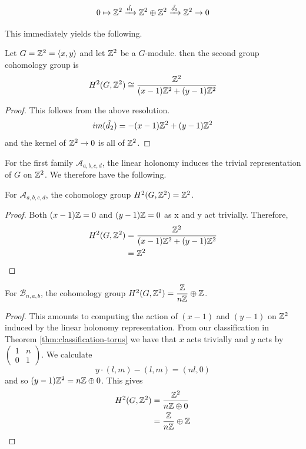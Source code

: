 $$
    0 \mapsto \mathbb{Z}^2 \xrightarrow{\tilde{d_1}} \mathbb{Z}^2 \oplus \mathbb{Z}^2 \xrightarrow{\tilde{d_2}} \mathbb{Z}^2 \to 0
$$

This immediately yields the following.

\begin{lemma}
    Let $G = \mathbb{Z}^2 = \langle x, y \rangle$ and let $\mathbb{Z}^2$ be a $G$-module. then the second group cohomology group is
    $$
        H^2(G, \mathbb{Z}^2) \cong \dfrac{\mathbb{Z}^2}{(x-1)\mathbb{Z}^2 +(y-1)\mathbb{Z}^2}
    $$
\end{lemma}
\begin{proof}
    This follows from the above resolution.
    $$
        im(\tilde{d_2}) = -(x-1)\mathbb{Z}^2 +(y-1)\mathbb{Z}^2
    $$
    and the kernel of $\mathbb{Z}^2 \to 0$ is all of $\mathbb{Z}^2$.
\end{proof}

For the first family $\mathcal{A}_{a,b,c,d}$, the linear holonomy induces the
trivial representation of $G$ on $\mathbb{Z}^2$. We therefore have the following.

\begin{lemma}\label{lemma:chern-class-A}
    For $\mathcal{A}_{a,b,c,d}$, the cohomology group $H^2(G, \mathbb{Z}^2) = \mathbb{Z}^2$.
\end{lemma}
\begin{proof}
    Both $(x-1)\mathbb{Z}=0$ and $(y-1)\mathbb{Z}=0$ as x and y act trivially. Therefore,
    \begin{align*}
        H^2(G, \mathbb{Z}^2) & = \dfrac{\mathbb{Z}^2}{(x-1)\mathbb{Z}^2 +(y-1)\mathbb{Z}^2} \\
                     & = \mathbb{Z}^2
    \end{align*}
\end{proof}

\begin{lemma}\label{lemma:chern-class-B}
    For $\mathcal{B}_{n,a,b}$, the cohomology group $H^2(G, \mathbb{Z}^2) = \dfrac{\mathbb{Z}}{n \mathbb{Z}} \oplus \mathbb{Z}$.
\end{lemma}
\begin{proof}
    This amounts to computing the action of $(x-1)$ and $(y-1)$ on $\mathbb{Z}^2$ induced by the linear holonomy representation.
    From our classification in Theorem \ref{thm:classification-torus} we have that $x$ acts trivially and $y$ acts by
    $\begin{pmatrix}
            1 & n \\
            0 & 1
        \end{pmatrix}$. We calculate
    $$y\cdot (l,m) - (l,m) = (nl, 0)$$
    and so $(y-1)\mathbb{Z}^2 = n\mathbb{Z} \oplus 0$. This gives
    \begin{align*}
        H^2(G, \mathbb{Z}^2) & =\dfrac{\mathbb{Z}^2}{n\mathbb{Z} \oplus 0}  \\
                     & = \dfrac{\mathbb{Z}}{n \mathbb{Z}} \oplus \mathbb{Z}
    \end{align*}
\end{proof}

